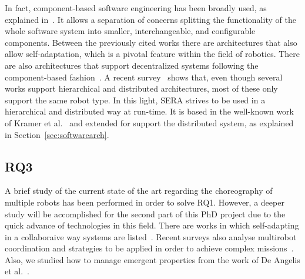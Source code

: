In fact, component-based software engineering has been broadly used, as explained in~\cite{Brugali2009}. 
It allows a separation of concerns splitting the functionality of the whole software system into smaller, interchangeable, and configurable components. 
Between the previously cited works there are architectures that also allow self-adaptation, which is a pivotal feature within the field of robotics.
There are also architectures that support decentralized systems following the component-based fashion~\cite{Lesire2016}.
A recent survey~\cite{Yan2013} shows that, even though several works support hierarchical and distributed architectures, most of these only support the same robot type. 
In this light, SERA strives to be used in a hierarchical and distributed way at run-time.
It is based in the well-known work of Kramer et al.~\cite{kramer} and extended for support the distributed system, as explained in Section~\ref{sec:softwarearch}.

\subsection{RQ3}

A brief study of the current state of the art regarding the choreography of multiple robots has been performed in order to solve RQ1.
However, a deeper study will be accomplished for the second part of this PhD project due to the quick advance of technologies in this field.
There are works in which self-adapting in a collaboraive way systems are listed~\cite{DeLemos2013}.
Recent surveys also analyse multirobot coordination and strategies to be applied in order to achieve complex missions~\cite{Yan2013}.
Also, we studied how to manage emergent properties from the work of De Angelis et al.~\cite{DeAngelis2015,DeAngelis2016}.
